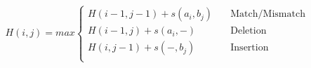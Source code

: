 \begin{figure*}[!t]
  \hfil
  \begin{equation}
    \label{eq:sw}
      H(i,j) = max \left \{
      \begin{array}{ll}
        H(i-1,j-1) + s(a_i,b_j) \quad & \text{Match/Mismatch} \\
        H(i-1,j) + s(a_i,-)     \quad & \text{Deletion}       \\
        H(i,j-1) + s(-,b_j)     \quad & \text{Insertion}      \\
      \end{array} \right.
  \end{equation}
  \hrulefill
\end{figure*}
